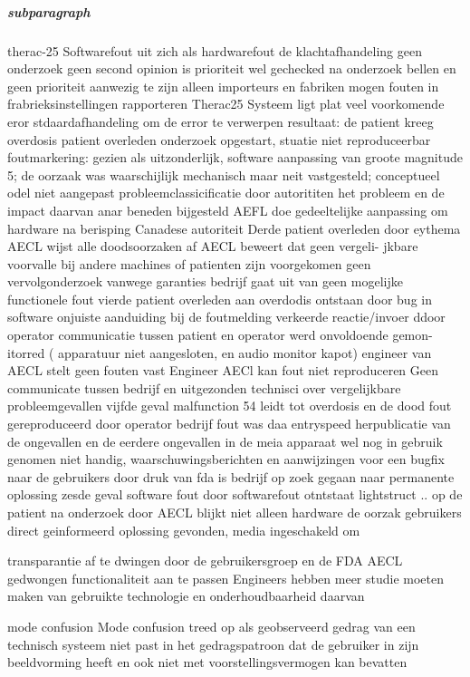 \documentclass[11pt]{report} %
\begin{document}
\subparagraph{subparagraph}
therac-25 
Softwarefout uit zich als hardwarefout de klachtafhandeling geen onderzoek geen second opinion is prioriteit wel 
gechecked na onderzoek bellen en geen prioriteit aanwezig te zijn alleen importeurs en fabriken mogen fouten 
in frabrieksinstellingen rapporteren 
Therac25 Systeem ligt plat veel voorkomende eror stdaardafhandeling om de error te verwerpen resultaat: 
de patient kreeg overdosis patient overleden onderzoek opgestart, stuatie niet reproduceerbar foutmarkering: 
gezien als uitzonderlijk, software aanpassing van groote magnitude 5; de oorzaak was waarschijlijk mechanisch 
maar neit vastgesteld; conceptueel odel niet aangepast probleemclassicificatie door autorititen het probleem 
en de impact daarvan anar beneden bijgesteld AEFL doe gedeeltelijke aanpassing om hardware na berisping 
Canadese autoriteit 
Derde patient overleden door eythema AECL wijst alle doodsoorzaken af AECL beweert dat geen vergeli- 
jkbare voorvalle bij andere machines of patienten zijn voorgekomen geen vervolgonderzoek vanwege garanties 
bedrijf gaat uit van geen mogelijke functionele fout 
vierde patient overleden aan overdodis ontstaan door bug in software onjuiste aanduiding bij de foutmelding 
verkeerde reactie/invoer ddoor operator communicatie tussen patient en operator werd onvoldoende gemon- 
itorred ( apparatuur niet aangesloten, en audio monitor kapot) engineer van AECL stelt geen fouten vast 
Engineer AECl kan fout niet reproduceren Geen communicate tussen bedrijf en uitgezonden technisci over 
vergelijkbare probleemgevallen 
vijfde geval malfunction 54 leidt tot overdosis en de dood fout gereproduceerd door operator bedrijf fout 
was daa entryspeed herpublicatie van de ongevallen en de eerdere ongevallen in de meia apparaat wel nog in 
gebruik genomen niet handig, waarschuwingsberichten en aanwijzingen voor een bugfix naar de gebruikers door 
druk van fda is bedrijf op zoek gegaan naar permanente oplossing 
zesde geval software fout door softwarefout otntstaat lightstruct .. op de patient na onderzoek door AECL 
blijkt niet alleen hardware de oorzak gebruikers direct geinformeerd oplossing gevonden, media ingeschakeld om 

transparantie af te dwingen door de gebruikersgroep en de FDA AECL gedwongen functionaliteit aan te passen 
Engineers hebben meer studie moeten maken van gebruikte technologie en onderhoudbaarheid daarvan 


mode confusion 
Mode confusion treed op als geobserveerd gedrag van een technisch systeem niet past in het gedragspatroon 
dat de gebruiker in zijn beeldvorming heeft en ook niet met voorstellingsvermogen kan bevatten 
\end{document}
